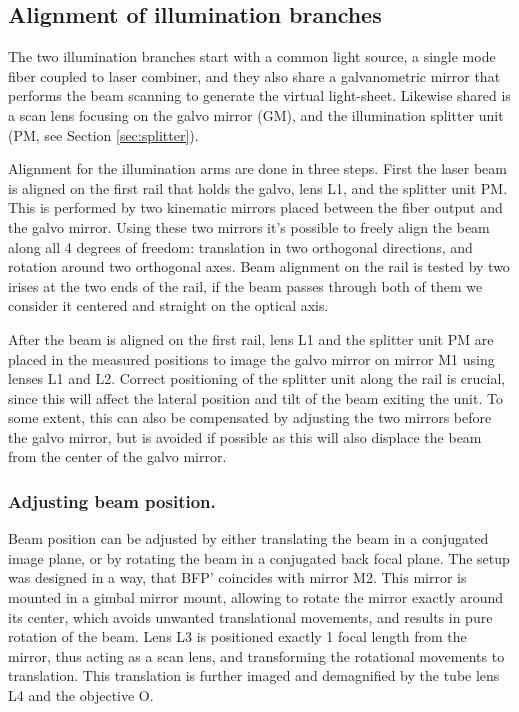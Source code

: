   \subsection{Alignment of illumination branches}

    The two illumination branches start with a common light source, a single mode fiber coupled to laser combiner, and they also share a galvanometric mirror that performs the beam scanning to generate the virtual light-sheet. Likewise shared is a scan lens focusing on the galvo mirror (GM), and the illumination splitter unit (PM, see Section \ref{sec:splitter}).

    Alignment for the illumination arms are done in three steps. First the laser beam is aligned on the first rail that holds the galvo, lens L1, and the splitter unit PM. This is performed by two kinematic mirrors placed between the fiber output and the galvo mirror. Using these two mirrors it's possible to freely align the beam along all 4 degrees of freedom: translation in two orthogonal directions, and rotation around two orthogonal axes. Beam alignment on the rail is tested by two irises at the two ends of the rail, if the beam passes through both of them we consider it centered and straight on the optical axis.

    After the beam is aligned on the first rail, lens L1 and the splitter unit PM are placed in the measured positions to image the galvo mirror on mirror M1 using lenses L1 and L2. Correct positioning of the splitter unit along the rail is crucial, since this will affect the lateral position and tilt of the beam exiting the unit. To some extent, this can also be compensated by adjusting the two mirrors before the galvo mirror, but is avoided if possible as this will also displace the beam from the center of the galvo mirror.

    \subsubsection{Adjusting beam position.}
      Beam position can be adjusted by either translating the beam in a conjugated image plane, or by rotating the beam in a conjugated back focal plane. The setup was designed in a way, that BFP' coincides with mirror M2. This mirror is mounted in a gimbal mirror mount, allowing to rotate the mirror exactly around its center, which avoids unwanted translational movements, and results in pure rotation of the beam. Lens L3 is positioned exactly 1 focal length from the mirror, thus acting as a scan lens, and transforming the rotational movements to translation. This translation is further imaged and demagnified by the tube lens L4 and the objective O.


